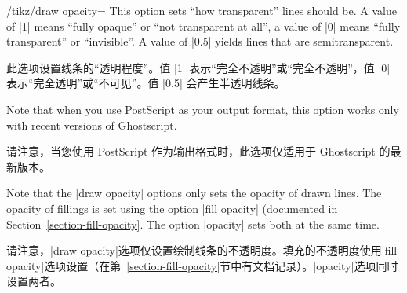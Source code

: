 \begin{key}{/tikz/draw opacity=}
    This option sets ``how transparent'' lines should be. A value of |1| means
    ``fully opaque'' or ``not transparent at all'', a value of |0| means
    ``fully transparent'' or ``invisible''. A value of |0.5| yields lines that
    are semitransparent.

    此选项设置线条的“透明程度”。值 |1| 表示“完全不透明”或“完全不透明”，值 |0| 表示“完全透明”或“不可见”。值 |0.5| 会产生半透明线条。

    Note that when you use PostScript as your output format, this option works
    only with recent versions of Ghostscript.
    
    请注意，当您使用 PostScript 作为输出格式时，此选项仅适用于 Ghostscript 的最新版本。
\begin{codeexample}[]
\end{codeexample}
\end{key}

Note that the |draw opacity| options only sets the opacity of drawn lines. The
opacity of fillings is set using the option |fill opacity| (documented in
Section~\ref{section-fill-opacity}. The option |opacity| sets both at the same
time.

请注意，|draw opacity|选项仅设置绘制线条的不透明度。填充的不透明度使用|fill opacity|选项设置（在第~\ref{section-fill-opacity}节中有文档记录）。|opacity|选项同时设置两者。

